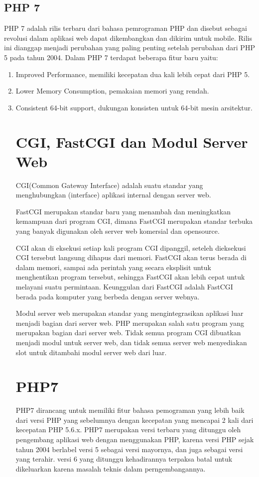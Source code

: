 \subsection{PHP 7}
PHP 7 adalah rilis terbaru dari bahasa pemrograman PHP dan disebut sebagai revolusi dalam aplikasi web dapat dikembangkan dan dikirim untuk mobile. Rilis ini dianggap menjadi perubahan yang paling penting setelah perubahan dari PHP 5 pada tahun 2004.
Dalam PHP 7 terdapat beberapa fitur baru yaitu:
\begin{enumerate}
\item Improved Performance, memiliki kecepatan dua kali lebih cepat dari PHP 5.
\item Lower Memory Consumption, pemakaian memori yang rendah.
\item Consistent 64-bit support, dukungan konsisten untuk 64-bit mesin arsitektur.

\section{CGI, FastCGI dan Modul Server Web}
CGI(Common Gateway Interface) adalah suatu standar yang menghubungkan (interface) aplikasi internal dengan server web.  

FastCGI merupakan standar baru yang menambah dan meningkatkan kemampuan dari program CGI, dimana FastCGI merupakan standar  terbuka yang banyak digunakan oleh server web komersial dan opensource.

CGI akan di eksekusi setiap  kali program CGI dipanggil, seteleh dieksekusi CGI tersebut langsung dihapus dari memori. FastCGI akan terus berada di dalam memori, sampai ada perintah  yang secara eksplisit untuk menghentikan program tersebut, sehingga FastCGI akan lebih cepat untuk melayani suatu permintaan. Keunggulan dari FastCGI adalah FastCGI  berada pada komputer yang berbeda dengan server webnya.

Modul server web merupakan standar yang mengintegrasikan aplikasi luar menjadi bagian dari server web. PHP merupakan salah satu program yang merupakan bagian dari server web. Tidak semua program CGI dibuatkan menjadi modul untuk server web, dan tidak semua server web menyediakan slot untuk ditambahi modul server web dari luar. 

\section{PHP7}
PHP7 dirancang untuk memiliki fitur bahasa pemograman yang lebih baik dari versi PHP yang sebelumnya dengan kecepatan yang mencapai 2 kali dari kecepatan PHP 5.6.x. PHP7 merupakan versi terbaru yang ditunggu oleh pengembang aplikasi web dengan menggunakan PHP, karena versi PHP sejak tahun 2004 berlabel versi 5 sebagai versi mayornya, dan juga sebagai versi yang terahir. versi 6 yang ditunggu kehadirannya terpaksa batal untuk dikeluarkan karena masalah teknis dalam perngembangannya.


\end{enumerate}
